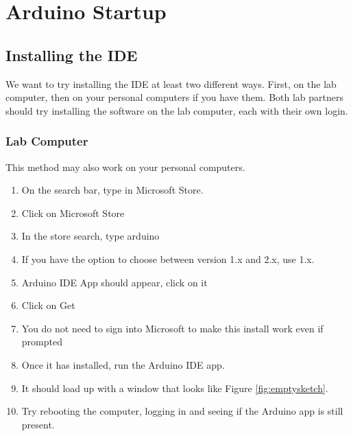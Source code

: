 \chapter{Arduino Startup}

\section{Installing the IDE}
We want to try installing the IDE at least two different ways. First, on the lab computer, then on your personal
computers if you have them. Both lab partners should try installing the software on the lab computer, each with 
their own login.

\subsection{Lab Computer}
This method may also work on your personal computers.
\begin{enumerate}
    \item On the search bar, type in Microsoft Store.
    \item Click on Microsoft Store
    \item In the store search, type arduino
    \item If you have the option to choose between version 1.x and 2.x, use 1.x.
    \item Arduino IDE App should appear, click on it
    \item Click on Get
    \item You do not need to sign into Microsoft to make this install work even if prompted
    \item Once it has installed, run the Arduino IDE app. 
	\item It should load up with a window that looks like Figure \ref{fig:emptysketch}.
	\item Try rebooting the computer, logging in and seeing if the Arduino app is still present.
\end{enumerate}

